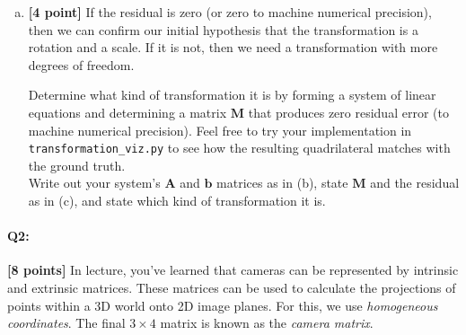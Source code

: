 \begin{enumerate}[(a)]
\begin{tcolorbox}[colback=white!5!white,colframe=green!75!black]
{{    %
    }}
\end{tcolorbox}

\pagebreak
\item \textbf{[4 point]} If the residual is zero (or zero to machine numerical precision), then we can confirm our initial hypothesis that the transformation is a rotation and a scale. If it is not, then we need a transformation with more degrees of freedom.

\begin{tcolorbox}[colback=orange!5!white,colframe=orange!75!black]
    Determine what kind of transformation it is by forming a system of linear equations and determining a matrix $\bm{M}$ that produces zero residual error (to machine numerical precision). Feel free to try your implementation in 
    \texttt{transformation\_viz.py} to see how the resulting quadrilateral matches with the ground truth.
    \\ 
    
    Write out your system's $\bm{A}$ and $\bm{b}$ matrices as in (b), state $\bm{M}$ and the residual as in (c), and state which kind of transformation it is.
\end{tcolorbox}


\end{enumerate}



\pagebreak
\paragraph{Q2:} \textbf{[8 points]}
In lecture, you've learned that cameras can be represented by intrinsic and extrinsic matrices. These matrices can be used to calculate the projections of points within a 3D world onto 2D image planes. For this, we use \emph{homogeneous coordinates}. The final $3\times4$ matrix is known as the \emph{camera matrix}.

